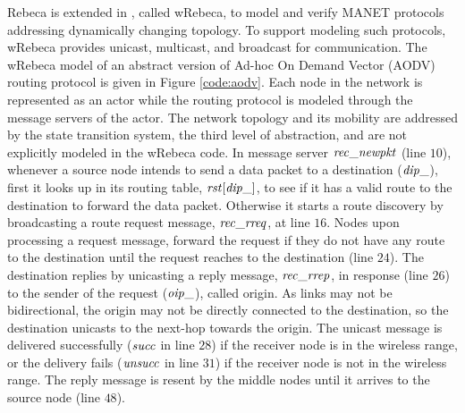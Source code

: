 Rebeca is extended in \cite{FOAC}, called wRebeca, to model and verify %
MANET protocols addressing dynamically changing topology. To support modeling such protocols, wRebeca provides unicast, multicast, and broadcast for communication. The wRebeca model of an abstract version of Ad-hoc On Demand Vector (AODV) routing protocol \cite{AODV} is given in Figure \ref{code:aodv}. Each node in the network is represented as an actor while the routing protocol
is modeled through the message servers of the actor. The network topology and its mobility are addressed by the state transition system, the third level of abstraction, and are not explicitly modeled in the wRebeca code.  
%
In message server ${\it rec\_newpkt}$ (line $10$),
whenever a source node intends to send a data packet to a destination (${\it dip\_}$), %
first it looks up in its routing table, ${\it rst}[{\it dip\_}]$, to see if it has a valid route to the destination to forward the data packet. Otherwise it starts a route discovery by broadcasting a route request message, ${\it rec\_rreq}$, at line $16$. 
%
Nodes upon processing a request message, forward the request if they do not have any route to the destination until the request reaches to the destination (line $24$). The destination replies by unicasting a reply message, ${\it rec\_rrep}$, in response (line $26$) to the sender of the request (${\it oip\_}$), called origin. As links may not be bidirectional, the origin may not be directly connected to the destination, so the destination unicasts to the next-hop towards the origin. The unicast message is delivered
successfully ($\it succ$ in line $28$) if the receiver node is in the wireless range, or the
delivery fails ($\it unsucc$ in line $31$) if the receiver node is not in the wireless range. The reply message is resent by the middle nodes until it arrives to the source node (line $48$).

\begin{figure*}
	\begin{center}
		
	\end{center}
	\caption{The AODV protocol specified by wRebeca \label{code:aodv}\cite{FOAC}}
\end{figure*} 


